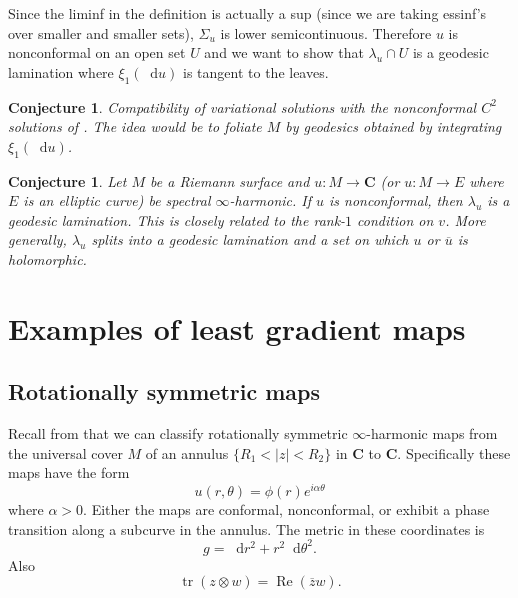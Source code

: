\documentclass[reqno,11pt]{amsart}
\newcommand{\CC}{\mathbf{C}}
\newcommand*\dif{\mathop{}\!\mathrm{d}}
\DeclareMathOperator{\tr}{tr}
\renewcommand{\Re}{\operatorname{Re}}
\newtheorem{conjecture}[theorem]{Conjecture}
\theoremstyle{definition}
\numberwithin{equation}{section}
\begin{document}
Since the liminf in the definition is actually a sup (since we are taking essinf's over smaller and smaller sets), $\Sigma_u$ is lower semicontinuous.
Therefore $u$ is nonconformal on an open set $U$ and we want to show that $\lambda_u \cap U$ is a geodesic lamination where $\xi_1(\dif u)$ is tangent to the leaves.
  
\begin{conjecture}
Compatibility of variational solutions with the nonconformal $C^2$ solutions of \cite{Sheffield2010VectorvaluedOL}.
The idea would be to foliate $M$ by geodesics obtained by integrating $\xi_1(\dif u)$.
\end{conjecture}

\begin{conjecture}
Let $M$ be a Riemann surface and $u: M \to \CC$ (or $u: M \to E$ where $E$ is an elliptic curve) be spectral $\infty$-harmonic.
If $u$ is nonconformal, then $\lambda_u$ is a geodesic lamination.
This is closely related to the rank-$1$ condition on $v$.
More generally, $\lambda_u$ splits into a geodesic lamination and a set on which $u$ or $\overline u$ is holomorphic.
\end{conjecture}

\section{Examples of least gradient maps}
\subsection{Rotationally symmetric maps}
Recall from \cite[\S4]{Sheffield2010VectorvaluedOL} that we can classify rotationally symmetric $\infty$-harmonic maps from the universal cover $M$ of an annulus $\{R_1 < |z| < R_2\}$ in $\CC$ to $\CC$.
Specifically these maps have the form 
$$u(r, \theta) = \phi(r) e^{i\alpha \theta}$$
where $\alpha > 0$.
Either the maps are conformal, nonconformal, or exhibit a phase transition along a subcurve in the annulus.
The metric in these coordinates is 
$$g = \dif r^2 + r^2 \dif \theta^2.$$
Also 
$$\tr(z \otimes w) = \Re(\overline zw).$$
\end{document}
